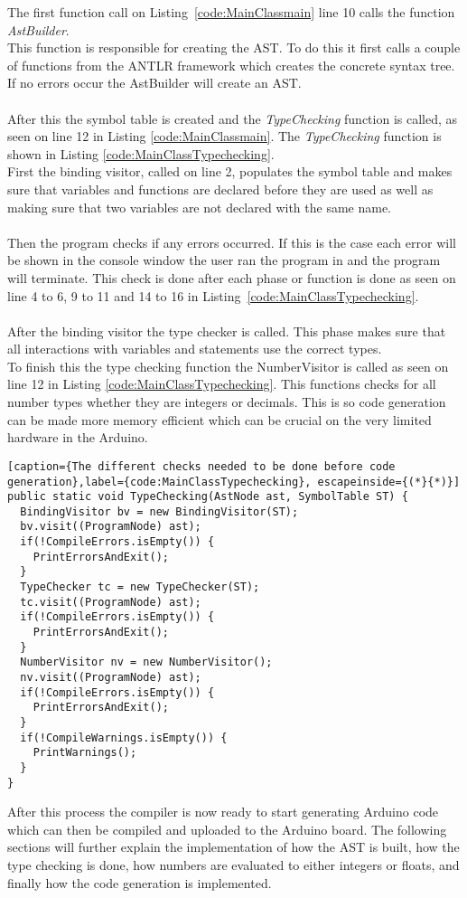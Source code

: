The first function call on Listing~\ref{code:MainClassmain} line 10 calls the function \textit{AstBuilder}.
\\
This function is responsible for creating the AST. 
To do this it first calls a couple of functions from the ANTLR framework which creates the concrete syntax tree.  
If no errors occur the AstBuilder will create an AST.
\\\\
After this the symbol table is created and the \textit{TypeChecking} function is called, as seen on line 12 in Listing \ref{code:MainClassmain}. 
The \textit{TypeChecking} function is shown in Listing \ref{code:MainClassTypechecking}.
\\
First the binding visitor, called on line 2, populates the symbol table and makes sure that variables and functions are declared before they are used as well as making sure that two variables are not declared with the same name. 
\\\\
Then the program checks if any errors occurred. 
If this is the case each error will be shown in the console window the user ran the program in and the program will terminate. 
This check is done after each phase or function is done as seen on line 4 to 6, 9 to 11 and 14 to 16 in Listing~\ref{code:MainClassTypechecking}.
\\\\
After the binding visitor the type checker is called. This phase makes sure that all interactions with variables and statements use the correct types.
\\
To finish this the type checking function the NumberVisitor is called as seen on line 12 in Listing \ref{code:MainClassTypechecking}. This functions checks for all number types whether they are integers or decimals. This is so code generation can be made more memory efficient which can be crucial on the very limited hardware in the Arduino.
\begin{lstlisting}[caption={The different checks needed to be done before code generation},label={code:MainClassTypechecking}, escapeinside={(*}{*)}]
public static void TypeChecking(AstNode ast, SymbolTable ST) {
  BindingVisitor bv = new BindingVisitor(ST);
  bv.visit((ProgramNode) ast);
  if(!CompileErrors.isEmpty()) {
    PrintErrorsAndExit();
  }
  TypeChecker tc = new TypeChecker(ST);
  tc.visit((ProgramNode) ast);
  if(!CompileErrors.isEmpty()) {
    PrintErrorsAndExit();
  }
  NumberVisitor nv = new NumberVisitor();
  nv.visit((ProgramNode) ast);
  if(!CompileErrors.isEmpty()) {
    PrintErrorsAndExit();
  }
  if(!CompileWarnings.isEmpty()) {
    PrintWarnings();
  }
}
\end{lstlisting}
After this process the compiler is now ready to start generating Arduino code which can then be compiled and uploaded to the Arduino board.
The following sections will further explain the implementation of how the AST is built, how the type checking is done, how numbers are evaluated to either integers or floats, and finally how the code generation is implemented.

